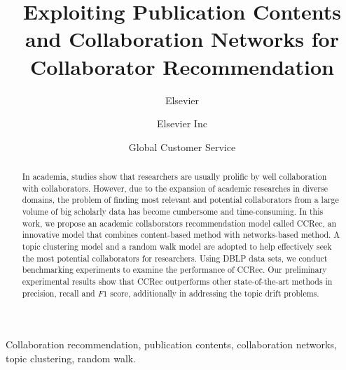 \documentclass[review]{elsarticle}
\begin{document}
\begin{frontmatter}

\title{Exploiting Publication Contents and Collaboration Networks for Collaborator Recommendation}

\author{Elsevier}
\address{Radarweg 29, Amsterdam}

\author[mymainaddress,mysecondaryaddress]{Elsevier Inc}

\author[mysecondaryaddress]{Global Customer Service}

\address[mymainaddress]{1600 John F Kennedy Boulevard, Philadelphia}
\address[mysecondaryaddress]{360 Park Avenue South, New York}

\begin{abstract}
In academia, studies show that researchers are usually prolific by well collaboration with collaborators. However, due to the expansion of academic researches in diverse domains, the problem of finding most relevant and potential collaborators from a large volume of big scholarly data has become cumbersome and time-consuming. In this work, we propose an academic collaborators recommendation model called CCRec, an innovative model that combines content-based method with networks-based method. A topic clustering model and a random walk model are adopted to help effectively seek the most potential collaborators for researchers. Using DBLP data sets, we conduct benchmarking experiments to examine the performance of CCRec. Our preliminary experimental results show that CCRec outperforms other state-of-the-art methods in precision, recall and $F1$ score, additionally in addressing the topic drift problems.
\end{abstract}

\begin{keyword}
Collaboration recommendation, publication contents, collaboration networks, topic clustering, random walk.
\end{keyword}

\end{frontmatter}

\linenumbers
\end{document}
